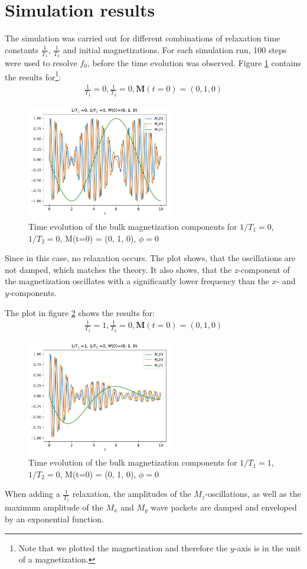 \documentclass[journal]{IEEEtran} %
\begin{document}
\section{Simulation results}
The simulation was carried out for different combinations of relaxation time constants $\frac{1}{T_1}$, $\frac{1}{T_2}$ and initial magnetizations. For each simulation run, 100 steps were used to resolve $f_0$, before the time evolution was observed.\newline
Figure \ref{f0} contains the results for\footnote{Note that we plotted the magnetization and therefore the $y$-axis is in the unit of a magnetization.}:
\begin{align}
    \frac{1}{T_1} = 0, \frac{1}{T_2} = 0, \mathbf{M}(t=0) = (0, 1, 0)
\end{align}
\begin{figure}[H]
\centering
\includegraphics[width=2.5in]{NMR_T1-0_T2-0_Minit-010_tau_0.01_t_10.pdf}
\caption{Time evolution of the bulk magnetization components for $1/T_1 = 0$, $1/T_2 = 0$, M(t=0) = (0, 1, 0), $\phi = 0$}
\label{f0}
\end{figure}
Since in this case, no relaxation occurs. The plot shows, that the oscillations are not damped, which matches the theory. It also shows, that the $z$-component of the magnetization oscillates with a significantly lower frequency than the $x$- and $y$-components.

The plot in figure \ref{f1} shows the results for:
\begin{align}
    \frac{1}{T_1} = 1, \frac{1}{T_2} = 0, \mathbf{M}(t=0) = (0, 1, 0)
\end{align}
\begin{figure}[H]
\centering
\includegraphics[width=2.5in]{figs/NMR_T1-1_T2-0_Minit-010_tau_0.01_t_10_no_phase.pdf}
\caption{Time evolution of the bulk magnetization components for $1/T_1 = 1$, $1/T_2 = 0$, M(t=0) = (0, 1, 0), $\phi = 0$}
\label{f1}
\end{figure}
When adding a $\frac{1}{T_1}$ relaxation, the amplitudes of the $M_z$-oscillations, as well as the maximum amplitude of the $M_x$ and $M_y$ wave packets are damped and enveloped by an exponential function.
\end{document}
